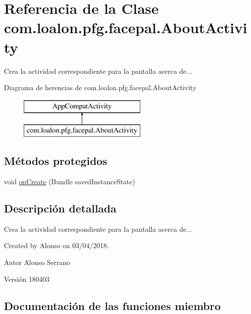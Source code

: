 \hypertarget{classcom_1_1loalon_1_1pfg_1_1facepal_1_1_about_activity}{}\section{Referencia de la Clase com.\+loalon.\+pfg.\+facepal.\+About\+Activity}
\label{classcom_1_1loalon_1_1pfg_1_1facepal_1_1_about_activity}


Crea la actividad correspondiente para la pantalla acerca de...  


Diagrama de herencias de com.\+loalon.\+pfg.\+facepal.\+About\+Activity\begin{figure}[H]
\begin{center}
\leavevmode
\includegraphics[height=2.000000cm]{classcom_1_1loalon_1_1pfg_1_1facepal_1_1_about_activity}
\end{center}
\end{figure}
\subsection*{Métodos protegidos}
\begin{DoxyCompactItemize}
\item 
void \mbox{\hyperlink{classcom_1_1loalon_1_1pfg_1_1facepal_1_1_about_activity_aaa1889e75b4be597a6e54ec668c03b03}{on\+Create}} (Bundle saved\+Instance\+State)
\end{DoxyCompactItemize}


\subsection{Descripción detallada}
Crea la actividad correspondiente para la pantalla acerca de... 

Created by Alonso on 03/04/2018. \begin{DoxyAuthor}{Autor}
Alonso Serrano 
\end{DoxyAuthor}
\begin{DoxyVersion}{Versión}
180403 
\end{DoxyVersion}


\subsection{Documentación de las funciones miembro}
\mbox{\label{classcom_1_1loalon_1_1pfg_1_1facepal_1_1_about_activity_aaa1889e75b4be597a6e54ec668c03b03}} 
